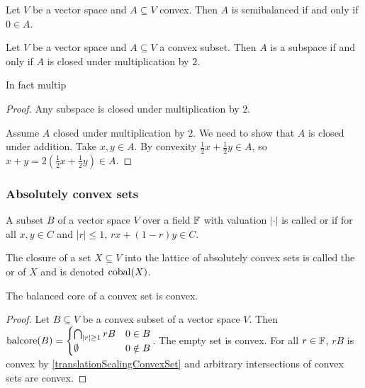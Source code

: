 \begin{lemma} \label{convexSemibalanced}
Let $V$ be a vector space and $A\subseteq V$ convex. Then $A$ is semibalanced \textup{if and only if} $0\in A$.
\end{lemma}

\begin{lemma} \label{convexSubspace}
Let $V$ be a vector space and $A \subseteq V$ a convex subset. Then $A$ is a subspace \textup{if and only if} $A$ is closed under multiplication by $2$.
\end{lemma}
In fact multip
\begin{proof}
Any subspace is closed under multiplication by $2$.

Assume $A$ closed under multiplication by $2$. We need to show that $A$ is closed under addition. Take $x,y\in A$. By convexity $\frac{1}{2}x + \frac{1}{2}y\in A$, so $x+ y = 2\left(\frac{1}{2}x + \frac{1}{2}y\right)\in A$.
\end{proof}

\subsubsection{Absolutely convex sets}
\begin{definition}
A subset $B$ of a vector space $V$ over a field $\mathbb{F}$ with valuation $|\cdot|$ is called  or  if for all $x,y\in C$ and $|r| \leq 1$, $rx + (1-r)y\in C$.

The closure of a set $X\subseteq V$ into the lattice of absolutely convex sets is called the  or  of $X$ and is denoted $\operatorname{cobal}(X)$.
\end{definition}

\begin{lemma} \label{balancedCoreConvexSet}
The balanced core of a convex set is convex.
\end{lemma}
\begin{proof}
Let $B\subseteq V$ be a convex subset of a vector space $V$. Then
$\operatorname{balcore}(B) = \begin{cases}
\bigcap_{|r|\geq 1}rB & 0\in B\\
\emptyset & 0\notin B
\end{cases}$. The empty set is convex. For all $r\in \mathbb{F}$, $rB$ is convex by \ref{translationScalingConvexSet} and arbitrary intersections of convex sets are convex.
\end{proof}

